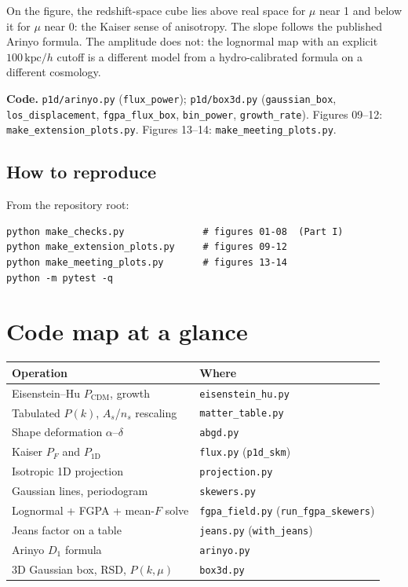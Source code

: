 \documentclass[11pt]{article}
\begin{document}
On the figure, the redshift-space cube lies above real space for $\mu$ near 1 and below it for $\mu$ near 0: the Kaiser sense of anisotropy.
The slope follows the published Arinyo formula.
The amplitude does not: the lognormal map with an explicit $100\,\mathrm{kpc}/h$ cutoff is a different model from a hydro-calibrated formula on a different cosmology.

\textbf{Code.}
\texttt{p1d/arinyo.py} (\texttt{flux\_power});
\texttt{p1d/box3d.py} (\texttt{gaussian\_box}, \texttt{los\_displacement}, \texttt{fgpa\_flux\_box}, \texttt{bin\_power}, \texttt{growth\_rate}).
Figures 09--12: \texttt{make\_extension\_plots.py}.
Figures 13--14: \texttt{make\_meeting\_plots.py}.

\subsection{How to reproduce}

From the repository root:
\begin{verbatim}
python make_checks.py              # figures 01-08  (Part I)
python make_extension_plots.py     # figures 09-12
python make_meeting_plots.py       # figures 13-14
python -m pytest -q
\end{verbatim}

\section{Code map at a glance}

\begin{center}
\small
\begin{tabular}{@{}p{}p{}@{}}
\toprule
Operation & Where \\
\midrule
Eisenstein--Hu $P_\mathrm{CDM}$, growth &
\texttt{eisenstein\_hu.py} \\
Tabulated $P(k)$, $A_s$/$n_s$ rescaling &
\texttt{matter\_table.py} \\
Shape deformation $\alpha$--$\delta$ &
\texttt{abgd.py} \\
Kaiser $P_F$ and $P_{1\mathrm{D}}$ &
\texttt{flux.py} (\texttt{p1d\_skm}) \\
Isotropic 1D projection &
\texttt{projection.py} \\
Gaussian lines, periodogram &
\texttt{skewers.py} \\
Lognormal + FGPA + mean-$F$ solve &
\texttt{fgpa\_field.py} (\texttt{run\_fgpa\_skewers}) \\
Jeans factor on a table &
\texttt{jeans.py} (\texttt{with\_jeans}) \\
Arinyo $D_1$ formula &
\texttt{arinyo.py} \\
3D Gaussian box, RSD, $P(k,\mu)$ &
\texttt{box3d.py} \\
\bottomrule
\end{tabular}
\end{center}
\end{document}
